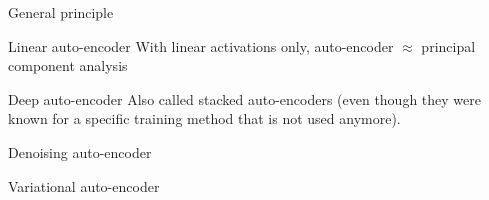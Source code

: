 \begin{frame}{General principle}
\end{frame}

\begin{frame}{Linear auto-encoder}
  With linear activations only, auto-encoder $\approx$ principal component analysis

\end{frame}

\begin{frame}{Deep auto-encoder}
  Also called stacked auto-encoders (even though they were known for a specific training method that is not used anymore).

\end{frame}

\begin{frame}{Denoising auto-encoder}
\end{frame}

\begin{frame}{Variational auto-encoder}
\end{frame}
